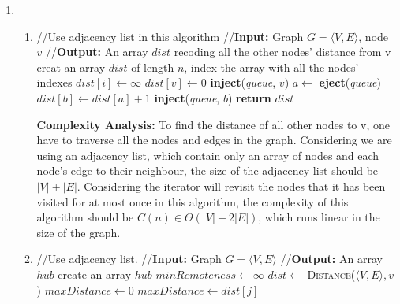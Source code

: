 \documentclass[11pt]{article}
\begin{document}
\begin{enumerate}
\begin{enumerate}
\end{enumerate}
~
\item
\begin{enumerate}
\item
\begin{algorithmic}[1]
	\State //Use adjacency list in this algorithm
	\State //\textbf{Input:} Graph $G = \langle V, E\rangle$, node $v$
	\State //\textbf{Output:} An array $dist$ recoding all the other nodes' distance from v
	\State creat an array $dist$ of length $n$, index the array with all the nodes' indexes
		\State $dist[i]\gets \infty$
		\State $dist[v]\gets 0$
	\EndFor
	\State \textbf{inject}(\textit{queue}, $v$)
		\State $a\gets$ \textbf{eject}(\textit{queue})
				\State $dist[b]\gets dist[a]+1$
				\State \textbf{inject}(\textit{queue}, $b$)
			\EndIf
		\EndFor 
	\EndWhile
	\State \textbf{return} $dist$
\EndFunction
\end{algorithmic}
\textbf{Complexity Analysis:} To find the distance of all other nodes to v, one have to traverse all the nodes and edges in the graph. Considering we are using an adjacency list, which contain only an array of nodes and each node's edge to their neighbour, the size of the adjacency list should be $|V| + |E|$. Considering the iterator will revisit the nodes that it has been visited for at most once in this algorithm, the complexity of this algorithm should be $C(n)\in \Theta(|V|+2|E|)$, which runs linear in the size of the graph.
\bigskip \\
\item
\begin{algorithmic}[1]
	\State //Use adjacency list.
	\State //\textbf{Input:} Graph $G = \langle V, E\rangle$
	\State //\textbf{Output:} An array $hub$
	\State create an array $hub$
	\State $minRemoteness\gets \infty$
		\State $dist\gets$ \textsc{Distance}($\langle V, E\rangle, v$)
		\State $maxDistance\gets 0$
				\State $maxDistance\gets dist[j]$

\end{algorithmic}
\end{enumerate}
\end{enumerate}
\end{document}
